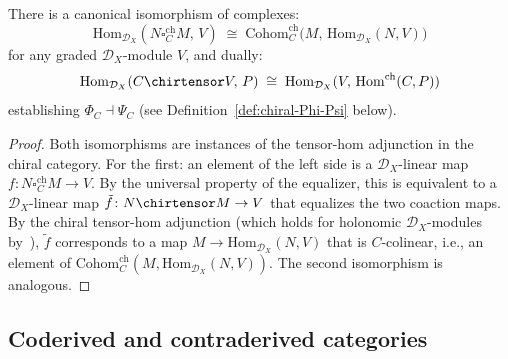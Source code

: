 \begin{lemma}\label{lem:chiral-co-contra-adjunction}
There is a canonical isomorphism of complexes:
\[
\mathrm{Hom}_{\mathcal{D}_X}(N \square_C^{\mathrm{ch}} M,\, V)
\;\cong\;
\mathrm{Cohom}_C^{\mathrm{ch}}\bigl(M,\,
\mathrm{Hom}_{\mathcal{D}_X}(N, V)\bigr)
\]
for any graded $\mathcal{D}_X$-module $V$, and dually:
\[
\mathrm{Hom}_{\mathcal{D}_X}(C \chirtensor V,\, P)
\;\cong\;
\mathrm{Hom}_{\mathcal{D}_X}(V,\,
\mathrm{Hom}^{\mathrm{ch}}(C, P))
\]
establishing $\Phi_C \dashv \Psi_C$
(see Definition~\textup{\ref{def:chiral-Phi-Psi}} below).
\end{lemma}

\begin{proof}
Both isomorphisms are instances of the tensor-hom adjunction in the
chiral category. For the first: an element of the left side is a
$\mathcal{D}_X$-linear map $f\colon N \square_C^{\mathrm{ch}} M \to V$.
By the universal property of the equalizer, this is equivalent to a
$\mathcal{D}_X$-linear map $\tilde{f}\colon N \chirtensor M \to V$
that equalizes the two coaction maps. By the chiral tensor-hom
adjunction (which holds for holonomic $\mathcal{D}_X$-modules
by~\cite[Proposition~3.4.6]{BD04}), $\tilde{f}$ corresponds to a map
$M \to \mathrm{Hom}_{\mathcal{D}_X}(N, V)$ that is
$C$-colinear, i.e., an element of
$\mathrm{Cohom}_C^{\mathrm{ch}}(M, \mathrm{Hom}_{\mathcal{D}_X}(N, V))$.
The second isomorphism is analogous.
\end{proof}

\subsection{Coderived and contraderived categories}
\label{subsec:chiral-coderived-contraderived}

